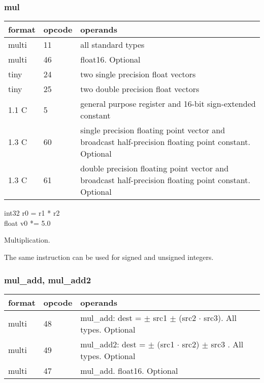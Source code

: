 \documentclass[forwardcom.tex]{subfiles}
\begin{document}
\subsubsection{mul}
\label{table:mulInstruction}
\begin{tabular}{|p{12mm}|p{12mm}|p{110mm}|}
\hline
\bfseries format & \bfseries opcode & \bfseries operands \\ \hline
multi & 11 & all standard types \\ \hline
multi & 46 & float16. Optional \\ \hline
tiny  & 24 & two single precision float vectors \\ \hline
tiny  & 25 & two double precision float vectors \\ \hline
1.1 C &  5 & general purpose register and 16-bit sign-extended constant \\ \hline
1.3 C & 60 & single precision floating point vector and broadcast half-precision floating point constant. Optional \\ \hline
1.3 C & 61 & double precision floating point vector and broadcast half-precision floating point constant. Optional \\ \hline
\end{tabular}
\vspace{2mm}

int32 r0 = r1 * r2 \\
float v0 *= 5.0
\vspace{2mm}

Multiplication.
\vspace{2mm}

The same instruction can be used for signed and unsigned integers.

\subsubsection{mul\_add, mul\_add2}
\label{table:mulAddInstruction}
\begin{tabular}{|p{12mm}|p{12mm}|p{110mm}|}
\hline
\bfseries format & \bfseries opcode & \bfseries operands \\ \hline
multi & 48 & mul\_add: dest = $\pm$ src1 $\pm$ (src2 $\cdot$ src3). All types. Optional \\ 
multi & 49 & mul\_add2: dest = $\pm$ (src1 $\cdot$ src2) $\pm$ src3 . All types. Optional \\
multi & 47 & mul\_add. float16. Optional \\ \hline
\hline
\end{tabular}
\vspace{2mm}
\end{document}
